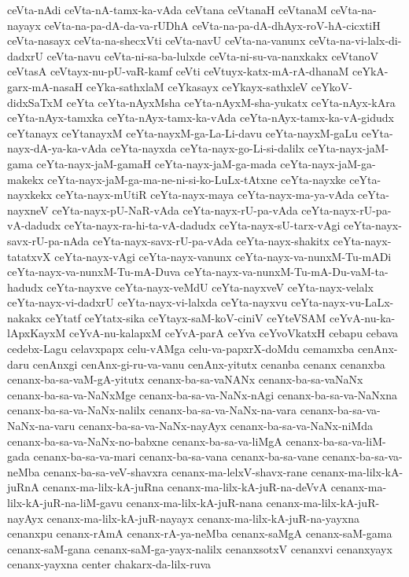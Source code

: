 {ceVta-nAdi
ceVta-nA-tamx-ka-vAda
ceVtana
ceVtanaH
ceVtanaM
ceVta-na-nayayx
ceVta-na-pa-dA-da-va-rUDhA
ceVta-na-pa-dA-dhAyx-roV-hA-cicxtiH
ceVta-nasayx
ceVta-na-shecxVti
ceVta-navU
ceVta-na-vanunx
ceVta-na-vi-lalx-di-dadxrU
ceVta-navu
ceVta-ni-sa-ba-lulxde
ceVta-ni-su-va-nanxkakx
ceVtanoV
ceVtasA
ceVtayx-nu-pU-vaR-kamf
ceVti
ceVtuyx-katx-mA-rA-dhanaM
ceYkA-garx-mA-nasaH
ceYka-sathxlaM
ceYkasayx
ceYkayx-sathxleV
ceYkoV-didxSaTxM
ceYta
ceYta-nAyxMsha
ceYta-nAyxM-sha-yukatx
ceYta-nAyx-kAra
ceYta-nAyx-tamxka
ceYta-nAyx-tamx-ka-vAda
ceYta-nAyx-tamx-ka-vA-gidudx
ceYtanayx
ceYtanayxM
ceYta-nayxM-ga-La-Li-davu
ceYta-nayxM-gaLu
ceYta-nayx-dA-ya-ka-vAda
ceYta-nayxda
ceYta-nayx-go-Li-si-dalilx
ceYta-nayx-jaM-gama
ceYta-nayx-jaM-gamaH
ceYta-nayx-jaM-ga-mada
ceYta-nayx-jaM-ga-makekx
ceYta-nayx-jaM-ga-ma-ne-ni-si-ko-LuLx-tAtxne
ceYta-nayxke
ceYta-nayxkekx
ceYta-nayx-mUtiR
ceYta-nayx-maya
ceYta-nayx-ma-ya-vAda
ceYta-nayxneV
ceYta-nayx-pU-NaR-vAda
ceYta-nayx-rU-pa-vAda
ceYta-nayx-rU-pa-vA-dadudx
ceYta-nayx-ra-hi-ta-vA-dadudx
ceYta-nayx-sU-tarx-vAgi
ceYta-nayx-savx-rU-pa-nAda
ceYta-nayx-savx-rU-pa-vAda
ceYta-nayx-shakitx
ceYta-nayx-tatatxvX
ceYta-nayx-vAgi
ceYta-nayx-vanunx
ceYta-nayx-va-nunxM-Tu-mADi
ceYta-nayx-va-nunxM-Tu-mA-Duva
ceYta-nayx-va-nunxM-Tu-mA-Du-vaM-ta-hadudx
ceYta-nayxve
ceYta-nayx-veMdU
ceYta-nayxveV
ceYta-nayx-velalx
ceYta-nayx-vi-dadxrU
ceYta-nayx-vi-lalxda
ceYta-nayxvu
ceYta-nayx-vu-LaLx-nakakx
ceYtatf
ceYtatx-sika
ceYtayx-saM-koV-ciniV
ceYteVSAM
ceYvA-nu-ka-lApxKayxM
ceYvA-nu-kalapxM
ceYvA-parA
ceYva
ceYvoVkatxH
cebapu
cebava
cedebx-Lagu
celavxpapx
celu-vAMga
celu-va-papxrX-doMdu
cemamxba
cenAnx-daru
cenAnxgi
cenAnx-gi-ru-va-vanu
cenAnx-yitutx
cenanba
cenanx
cenanxba
cenanx-ba-sa-vaM-gA-yitutx
cenanx-ba-sa-vaNANx
cenanx-ba-sa-vaNaNx
cenanx-ba-sa-va-NaNxMge
cenanx-ba-sa-va-NaNx-nAgi
cenanx-ba-sa-va-NaNxna
cenanx-ba-sa-va-NaNx-nalilx
cenanx-ba-sa-va-NaNx-na-vara
cenanx-ba-sa-va-NaNx-na-varu
cenanx-ba-sa-va-NaNx-nayAyx
cenanx-ba-sa-va-NaNx-niMda
cenanx-ba-sa-va-NaNx-no-babxne
cenanx-ba-sa-va-liMgA
cenanx-ba-sa-va-liM-gada
cenanx-ba-sa-va-mari
cenanx-ba-sa-vana
cenanx-ba-sa-vane
cenanx-ba-sa-va-neMba
cenanx-ba-sa-veV-shavxra
cenanx-ma-lelxV-shavx-rane
cenanx-ma-lilx-kA-juRnA
cenanx-ma-lilx-kA-juRna
cenanx-ma-lilx-kA-juR-na-deVvA
cenanx-ma-lilx-kA-juR-na-liM-gavu
cenanx-ma-lilx-kA-juR-nana
cenanx-ma-lilx-kA-juR-nayAyx
cenanx-ma-lilx-kA-juR-nayayx
cenanx-ma-lilx-kA-juR-na-yayxna
cenanxpu
cenanx-rAmA
cenanx-rA-ya-neMba
cenanx-saMgA
cenanx-saM-gama
cenanx-saM-gana
cenanx-saM-ga-yayx-nalilx
cenanxsotxV
cenanxvi
cenanxyayx
cenanx-yayxna
center
chakarx-da-lilx-ruva
}
